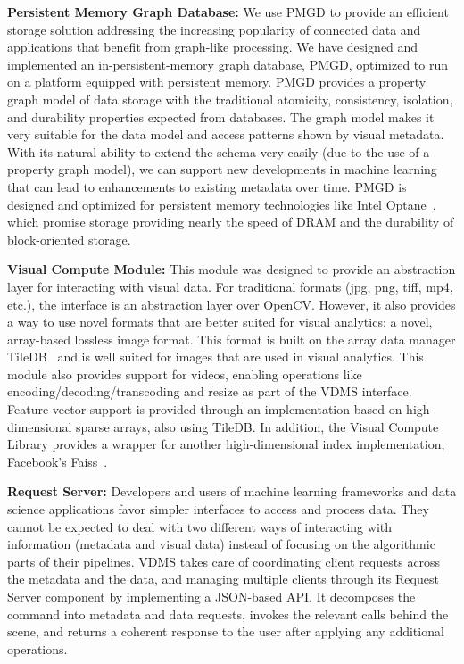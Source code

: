 \textbf{Persistent Memory Graph Database:}
We use PMGD to provide an efficient storage
solution addressing the increasing popularity of connected data and
applications that benefit from graph-like processing. We have designed
and implemented an in-persistent-memory graph database, PMGD, optimized
to run on a platform equipped with persistent memory.
PMGD provides a property graph model of data storage with the traditional
atomicity, consistency, isolation, and durability properties expected from
databases. The graph model makes it very suitable for the data model and
access patterns shown by visual metadata.
With its natural ability to extend the schema very
easily (due to the use of a property graph model),
we can support new developments in machine learning that can lead to
enhancements to existing metadata over time.
PMGD is designed and optimized for persistent memory technologies
like Intel Optane~\cite{IntelXPoint15}, which
promise storage providing nearly the speed of DRAM and the
durability of block-oriented storage.

\textbf{Visual Compute Module:} This module was designed to provide
an abstraction layer for interacting with visual data.
For traditional formats (jpg, png, tiff, mp4, etc.),
the interface is an abstraction layer over OpenCV. However, it also provides a
way to use novel formats that are better suited for visual analytics: a novel,
array-based lossless image format. This format is built on the array data
manager TileDB~\cite{TileDB} and is well suited for images that are used in
visual analytics.
This module also provides support for videos, enabling operations like
encoding/decoding/transcoding and resize as part of the VDMS interface.
Feature vector support is provided through an implementation based
on high-dimensional sparse arrays, also using TileDB.
In addition, the Visual Compute Library provides a wrapper
for another high-dimensional index implementation,
Facebook's Faiss~\cite{faiss}.

\textbf{Request Server:}
Developers and users of machine learning frameworks and data science
applications favor simpler interfaces to access and process data. They cannot be expected to deal with two different ways of interacting with information
(metadata and visual data) instead of focusing on the
algorithmic parts of their pipelines.
VDMS takes care of coordinating client requests across the metadata and the
data, and managing multiple clients through its Request
Server component by implementing a JSON-based API.
It decomposes the command into
metadata and data requests, invokes the relevant calls behind the scene,
and returns a coherent response to the user after applying any additional
operations.

